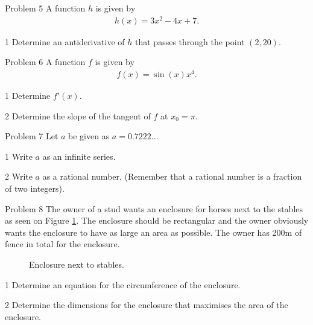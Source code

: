 %
%
%
%
%
\newpage
%
%
\begin{opgavetekst}{Problem 5}
	A function $h$ is given by
	\begin{align*}
		h(x) = 3x^2 - 4x + 7.
	\end{align*}
\end{opgavetekst}
\begin{delopgave}{1}
	Determine an antiderivative of $h$ that passes through the point $(2,20)$. 
\end{delopgave}
%
%
%
%
%
\begin{opgavetekst}{Problem 6}
	A function $f$ is given by
	\begin{align*}
		f(x) = \sin(x)x^4.
	\end{align*}
\end{opgavetekst}
\begin{delopgave}{1}
	Determine $f'(x)$. 
\end{delopgave}
\begin{delopgave}{2}
	Determine the slope of the tangent of $f$ at $x_0 = \pi$. 
\end{delopgave}
%
%
%
%
%
\begin{opgavetekst}{Problem 7}
	Let $a$ be given as $a = 0.7222\hdots$
\end{opgavetekst}
%
%
\begin{delopgave}{1}
	Write $a$ as an infinite series. 
\end{delopgave}
\begin{delopgave}{2}
	Write $a$ as a rational number. (Remember that a rational number is a fraction of two integers). 
\end{delopgave}
%
%
%
%
%
\begin{opgavetekst}{Problem 8}
	The owner of a stud wants an enclosure for horses next to the stables as seen on Figure \ref{fig:horse}.
	The enclosure should be rectangular and the owner obviously wants the enclosure to have as large an area as
	possible. The owner has 200m of fence in total for the enclosure.
	\begin{figure}[H]
		\centering
		\caption{Enclosure next to stables.}
		\label{fig:horse}
	\end{figure}
	\phantom{h}
\end{opgavetekst}
\begin{delopgave}{1}
	Determine an equation for the circumference of the enclosure.
\end{delopgave}
\begin{delopgave}{2}
	Determine the dimensions for the enclosure that maximises the area of the enclosure. 
\end{delopgave}